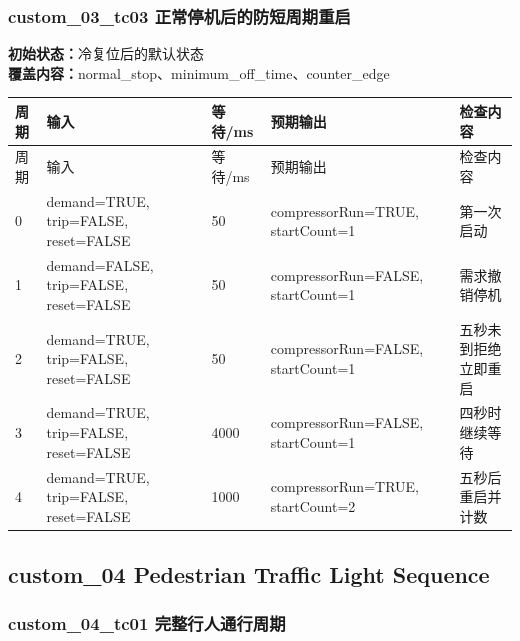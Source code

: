 \subsubsection{{\ttfamily custom\_03\_tc03} 正常停机后的防短周期重启}

\noindent\textbf{初始状态：}冷复位后的默认状态\\

\textbf{覆盖内容：}normal\_stop、minimum\_off\_time、counter\_edge

\begin{longtable}{L{1.0cm}L{4.7cm}L{1.4cm}L{4.0cm}L{2.1cm}}

\toprule

周期 & 输入 & 等待/ms & 预期输出 & 检查内容\\

\midrule

\endfirsthead

\toprule

周期 & 输入 & 等待/ms & 预期输出 & 检查内容\\

\midrule

\endhead

0 & demand=TRUE, trip=FALSE, reset=FALSE & 50 & compressorRun=TRUE, startCount=1 & 第一次启动\\

1 & demand=FALSE, trip=FALSE, reset=FALSE & 50 & compressorRun=FALSE, startCount=1 & 需求撤销停机\\

2 & demand=TRUE, trip=FALSE, reset=FALSE & 50 & compressorRun=FALSE, startCount=1 & 五秒未到拒绝立即重启\\

3 & demand=TRUE, trip=FALSE, reset=FALSE & 4000 & compressorRun=FALSE, startCount=1 & 四秒时继续等待\\

4 & demand=TRUE, trip=FALSE, reset=FALSE & 1000 & compressorRun=TRUE, startCount=2 & 五秒后重启并计数\\

\bottomrule

\end{longtable}

\subsection{{\ttfamily custom\_04} Pedestrian Traffic Light Sequence}

\subsubsection{{\ttfamily custom\_04\_tc01} 完整行人通行周期}

